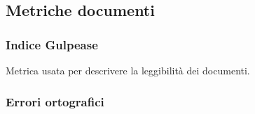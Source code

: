 \subsection{Metriche documenti}
\subsubsection{Indice Gulpease}
Metrica usata per descrivere la leggibilità dei documenti.
\subsubsection{Errori ortografici}